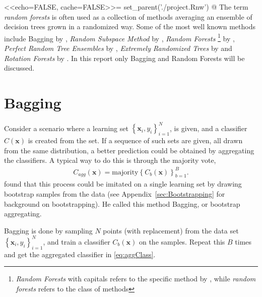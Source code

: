 <<echo=FALSE, cache=FALSE>>=
set_parent('./project.Rnw')
@
The term \textit{random forests} is often used as a collection of methods averaging an ensemble of decision trees grown in a randomized way. 
Some of the most well known methods include Bagging by \cite{Breiman1996}, \textit{Random Subspace Method} by \cite{ho1998random}, 
\textit{Random Forests} \footnote{\textit{Random Forests} with capitals refers to the specific method by \cite{randomforests}, while \textit{random forests} refers to the class of methods} by \cite{randomforests},
\textit{Perfect Random Tree Ensembles} by \cite{cutler2001pert}, \textit{Extremely Randomized Trees} by \cite{Geurts2006} and \textit{Rotation Forests} by \cite{Rodriguez2006}. 
In this report only Bagging and Random Forests will be discussed.

\section{Bagging}
\label{sec:Bagging}
Consider a scenario where a learning set $\left\{ \mathbf{x}_i, y_i \right\}_{i=1}^{N}$, is given, and a classifier $C(\mathbf{x})$ is created from the set. If a sequence of such sets are given, all drawn from the same distribution, a better prediction could be obtained by aggregating the classifiers. A typical way to do this is through the majority vote,
\begin{align}
  \label{eq:aggClass} 
  C_{agg}(\mathbf{x}) = \mathrm{majority} \left\{ C_b(\mathbf{x}) \right\}_{b=1}^{B}.
\end{align}
\cite{Breiman1996} found that this process could be imitated on a single learning set by drawing bootstrap samples from the data (see Appendix~\ref{sec:Bootstrapping} for background on bootstrapping). He called this method Bagging, or bootstrap aggregating. 

Bagging is done by sampling $N$ points (with replacement) from the data set $\left\{ \mathbf{x}_i, y_i \right\}_{i=1}^{N}$, and train a classifier $C_b(\mathbf{x})$ on the samples. Repeat this $B$ times and get the aggregated classifier in  \eqref{eq:aggClass}. 

